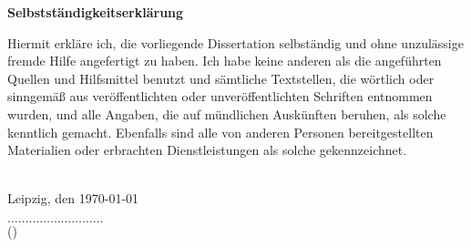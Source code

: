 \newpage
\begin{center}
{\bf Selbstst\"andigkeitserkl\"arung}
\end{center}
Hiermit erkl\"are ich, die vorliegende Dissertation selbst\"andig und ohne
unzul\"assige fremde Hilfe angefertigt zu haben. Ich habe keine anderen
als die angef\"uhrten Quellen und Hilfsmittel benutzt und s\"amtliche 
Textstellen, die w\"ortlich oder sinngem\"a{\ss} aus ver\"offentlichten oder unver\"offentlichten Schriften entnommen wurden, und alle Angaben, die auf m\"undlichen Ausk\"unften beruhen, als solche kenntlich gemacht. 
Ebenfalls sind alle von anderen Personen bereitgestellten Materialien 
oder erbrachten Dienstleistungen als solche gekennzeichnet.\\
\\
\begin{flushleft}
Leipzig, den \today
\end{flushleft}
\vspace*{0.5cm}
\begin{flushleft}
$\ldots\ldots\ldots\ldots\ldots\ldots\ldots\ldots\ldots$\\
{\small(\me)}
\end{flushleft}